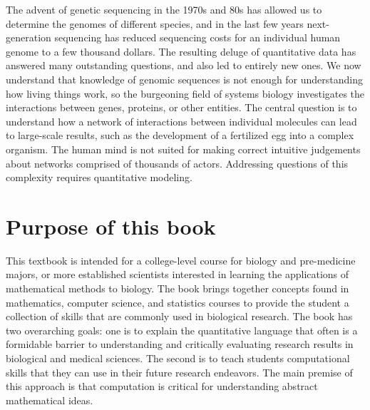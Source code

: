 \documentclass[
]{book}
\begin{document}
The advent of  genetic sequencing in the 1970s and 80s has allowed us to determine the genomes of different species, and in the last few years  next-generation sequencing has reduced sequencing costs for an individual human genome to a few thousand dollars. The resulting deluge of quantitative data has answered many outstanding questions, and also led to entirely new ones. We now understand that knowledge of genomic sequences is not enough for understanding how living things work, so the burgeoning field of  systems biology investigates the interactions between genes, proteins, or other entities. The central question is to understand how a network of interactions between individual molecules can lead to large-scale results, such as the development of a fertilized egg into a complex organism. The human mind is not suited for making correct intuitive judgements about networks comprised of thousands of actors. Addressing questions of this complexity requires quantitative modeling.

\hypertarget{purpose-of-this-book}{%
\section{Purpose of this book}\label{purpose-of-this-book}}

This textbook is intended for a college-level course for biology and pre-medicine majors, or more established scientists interested in learning the applications of mathematical methods to biology. The book brings together concepts found in mathematics, computer science, and statistics courses to provide the student a collection of skills that are commonly used in biological research. The book has two overarching goals: one is to explain the quantitative language that often is a formidable barrier to understanding and critically evaluating research results in biological and medical sciences. The second is to teach students computational skills that they can use in their future research endeavors. The main premise of this approach is that computation is critical for understanding abstract mathematical ideas.
\end{document}
